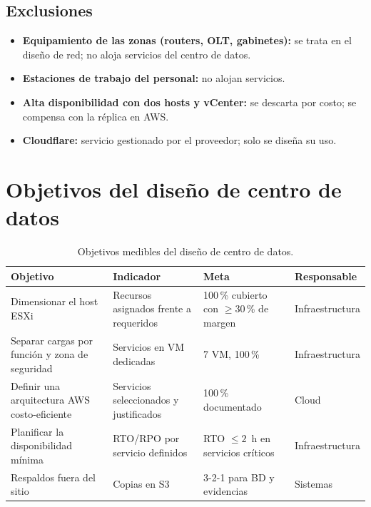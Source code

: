 \subsection{Exclusiones}
\begin{itemize}
  \item \textbf{Equipamiento de las zonas (routers, OLT, gabinetes):} se trata en el
  diseño de red; no aloja servicios del centro de datos.
  \item \textbf{Estaciones de trabajo del personal:} no alojan servicios.
  \item \textbf{Alta disponibilidad con dos hosts y vCenter:} se descarta por costo; se
  compensa con la réplica en AWS.
  \item \textbf{Cloudflare:} servicio gestionado por el proveedor; solo se diseña su uso.
\end{itemize}

\section{Objetivos del diseño de centro de datos}

\begin{table}[H]
\centering
\caption{Objetivos medibles del diseño de centro de datos.}
\label{tab:ce03-objetivos-dc}
\small
\begin{tabularx}{\textwidth}{XL{3.6cm}L{2.2cm}L{2.2cm}}
\toprule
\textbf{Objetivo} & \textbf{Indicador} & \textbf{Meta} & \textbf{Responsable} \\
\midrule
Dimensionar el host ESXi & Recursos asignados frente a requeridos & 100\,\% cubierto con $\geq 30$\,\% de margen & Infraestructura \\
Separar cargas por función y zona de seguridad & Servicios en VM dedicadas & 7 VM, 100\,\% & Infraestructura \\
Definir una arquitectura AWS costo-eficiente & Servicios seleccionados y justificados & 100\,\% documentado & Cloud \\
Planificar la disponibilidad mínima & RTO/RPO por servicio definidos & RTO $\leq 2$~h en servicios críticos & Infraestructura \\
Respaldos fuera del sitio & Copias en S3 & 3-2-1 para BD y evidencias & Sistemas \\
\bottomrule
\end{tabularx}
\end{table}

